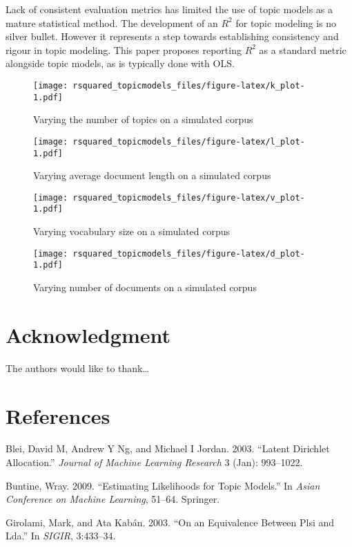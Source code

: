\documentclass[conference,final,]{IEEEtran}
\makeatletter
\def\maxwidth{\ifdim\Gin@nat@width>\linewidth\linewidth
\else\Gin@nat@width\fi}
\let\Oldincludegraphics\includegraphics
\renewcommand{\includegraphics}[1]{\Oldincludegraphics[width=\maxwidth]{#1}}
\makeatother
\begin{document}
Lack of consistent evaluation metrics has limited the use of topic
models as a mature statistical method. The development of an \(R^2\) for
topic modeling is no silver bullet. However it represents a step towards
establishing consistency and rigour in topic modeling. This paper
proposes reporting \(R^2\) as a standard metric alongside topic models,
as is typically done with OLS.

\begin{figure}
\centering
\texttt{[image: rsquared\_topicmodels\_files/figure-latex/k\_plot-1.pdf]}
\caption{Varying the number of topics on a simulated corpus}
\end{figure}

\begin{figure}
\centering
\texttt{[image: rsquared\_topicmodels\_files/figure-latex/l\_plot-1.pdf]}
\caption{Varying average document length on a simulated corpus}
\end{figure}

\begin{figure}
\centering
\texttt{[image: rsquared\_topicmodels\_files/figure-latex/v\_plot-1.pdf]}
\caption{Varying vocabulary size on a simulated corpus}
\end{figure}

\begin{figure}
\centering
\texttt{[image: rsquared\_topicmodels\_files/figure-latex/d\_plot-1.pdf]}
\caption{Varying number of documents on a simulated corpus}
\end{figure}

\hypertarget{acknowledgment}{%
\section{Acknowledgment}\label{acknowledgment}}

The authors would like to thank\ldots{}

\newpage

\hypertarget{references}{%
\section*{References}\label{references}}

\hypertarget{refs}{}
\leavevmode\hypertarget{ref-blei2003latent}{}%
Blei, David M, Andrew Y Ng, and Michael I Jordan. 2003. ``Latent
Dirichlet Allocation.'' \emph{Journal of Machine Learning Research} 3
(Jan): 993--1022.

\leavevmode\hypertarget{ref-buntine2009estimating}{}%
Buntine, Wray. 2009. ``Estimating Likelihoods for Topic Models.'' In
\emph{Asian Conference on Machine Learning}, 51--64. Springer.

\leavevmode\hypertarget{ref-girolami2003equivalence}{}%
Girolami, Mark, and Ata Kabán. 2003. ``On an Equivalence Between Plsi
and Lda.'' In \emph{SIGIR}, 3:433--34.
\end{document}
